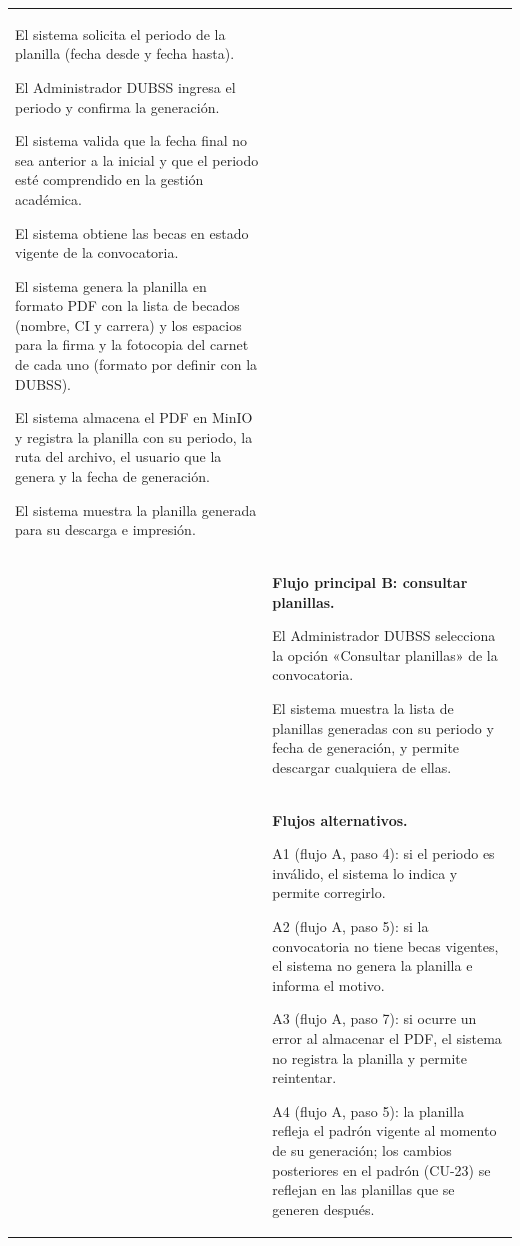 \begin{longtable}{>{\raggedright\arraybackslash}p{2.9cm} >{\raggedright\arraybackslash}p{12.6cm}}
\begin{cupasos}
    \item El sistema solicita el periodo de la planilla (fecha desde y fecha hasta).
    \item El Administrador DUBSS ingresa el periodo y confirma la generación.
    \item El sistema valida que la fecha final no sea anterior a la inicial y que el periodo esté comprendido en la gestión académica.
    \item El sistema obtiene las becas en estado vigente de la convocatoria.
    \item El sistema genera la planilla en formato PDF con la lista de becados (nombre, CI y carrera) y los espacios para la firma y la fotocopia del carnet de cada uno (formato por definir con la DUBSS).
    \item El sistema almacena el PDF en MinIO y registra la planilla con su periodo, la ruta del archivo, el usuario que la genera y la fecha de generación.
    \item El sistema muestra la planilla generada para su descarga e impresión.
\end{cupasos} \\
 & \textbf{Flujo principal B: consultar planillas.}
\begin{cupasos}
    \item El Administrador DUBSS selecciona la opción «Consultar planillas» de la convocatoria.
    \item El sistema muestra la lista de planillas generadas con su periodo y fecha de generación, y permite descargar cualquiera de ellas.
\end{cupasos} \\
 & \textbf{Flujos alternativos.}
\begin{cuvin}
    \item A1 (flujo A, paso 4): si el periodo es inválido, el sistema lo indica y permite corregirlo.
    \item A2 (flujo A, paso 5): si la convocatoria no tiene becas vigentes, el sistema no genera la planilla e informa el motivo.
    \item A3 (flujo A, paso 7): si ocurre un error al almacenar el PDF, el sistema no registra la planilla y permite reintentar.
    \item A4 (flujo A, paso 5): la planilla refleja el padrón vigente al momento de su generación; los cambios posteriores en el padrón (CU-23) se reflejan en las planillas que se generen después.
\end{cuvin} \\

\end{longtable}
